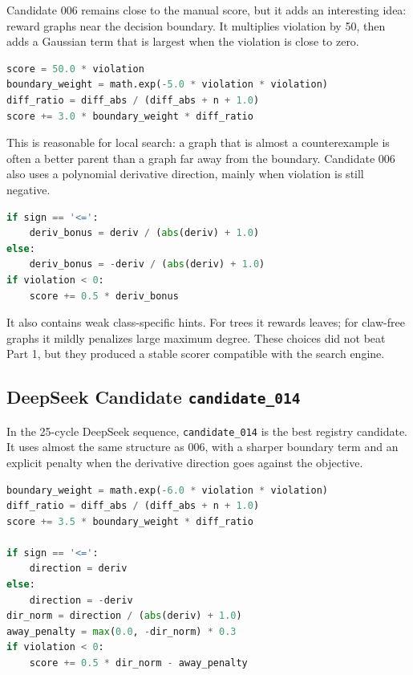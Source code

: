\documentclass[11pt,a4paper]{article}
\begin{document}
Candidate 006 remains close to the manual score, but it adds an interesting idea: reward graphs near the decision boundary. It multiplies violation by 50, then adds a Gaussian term that is largest when the violation is close to zero.

\begin{lstlisting}[language=Python,caption={Excerpt from \texttt{candidate\_006.py}.}]
score = 50.0 * violation
boundary_weight = math.exp(-5.0 * violation * violation)
diff_ratio = diff_abs / (diff_abs + n + 1.0)
score += 3.0 * boundary_weight * diff_ratio
\end{lstlisting}

This is reasonable for local search: a graph that is almost a counterexample is often a better parent than a graph far away from the boundary. Candidate 006 also uses a polynomial derivative direction, mainly when violation is still negative.

\begin{lstlisting}[language=Python,caption={Derivative guidance in \texttt{candidate\_006.py}.}]
if sign == '<=':
    deriv_bonus = deriv / (abs(deriv) + 1.0)
else:
    deriv_bonus = -deriv / (abs(deriv) + 1.0)
if violation < 0:
    score += 0.5 * deriv_bonus
\end{lstlisting}

It also contains weak class-specific hints. For trees it rewards leaves; for claw-free graphs it mildly penalizes large maximum degree. These choices did not beat Part 1, but they produced a stable scorer compatible with the search engine.

\subsection{DeepSeek Candidate \texttt{candidate\_014}}

In the 25-cycle DeepSeek sequence, \texttt{candidate\_014} is the best registry candidate. It uses almost the same structure as 006, with a sharper boundary term and an explicit penalty when the derivative direction goes against the objective.

\begin{lstlisting}[language=Python,caption={Excerpt from \texttt{candidate\_014.py}.}]
boundary_weight = math.exp(-6.0 * violation * violation)
diff_ratio = diff_abs / (diff_abs + n + 1.0)
score += 3.5 * boundary_weight * diff_ratio

if sign == '<=':
    direction = deriv
else:
    direction = -deriv
dir_norm = direction / (abs(deriv) + 1.0)
away_penalty = max(0.0, -dir_norm) * 0.3
if violation < 0:
    score += 0.5 * dir_norm - away_penalty
\end{lstlisting}
\end{document}
